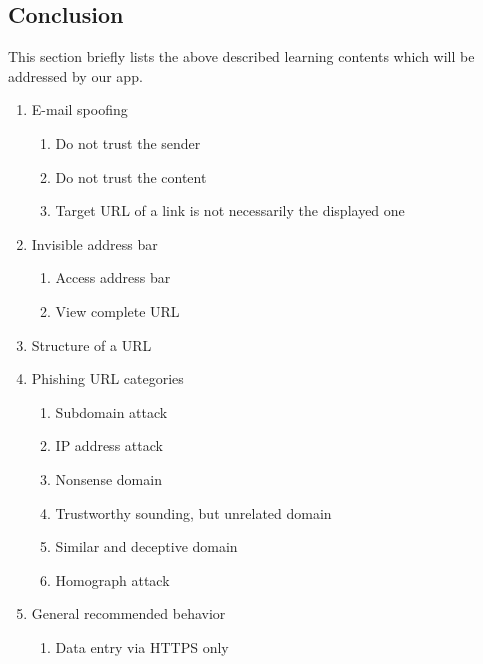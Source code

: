 

\subsection{Conclusion}

This section briefly lists the above described learning contents which will be addressed by our app.

\begin{enumerate}
	\item E-mail spoofing 
	\begin{enumerate}
		\item Do not trust the sender
		\item Do not trust the content
		\item Target URL of a link is not necessarily the displayed one
	\end{enumerate}
	\item Invisible address bar
	\begin{enumerate}
		\item Access address bar
		\item View complete URL
	\end{enumerate}
	\item Structure of a URL
	\item Phishing URL categories
	\begin{enumerate}
		\item Subdomain attack
		\item IP address attack
		\item Nonsense domain
		\item Trustworthy sounding, but unrelated domain
		\item Similar and deceptive domain
		\item Homograph attack
	\end{enumerate}
	\item General recommended behavior
	\begin{enumerate}
		\item Data entry via HTTPS only
	\end{enumerate}
	
\end{enumerate}
